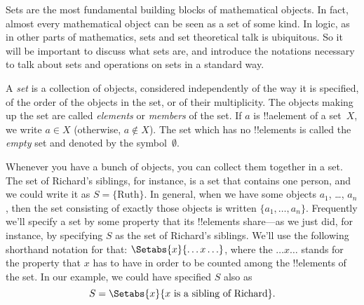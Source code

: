 \documentclass[../../../include/open-logic-section]{subfiles}
\begin{document}

\begin{explain}
Sets are the most fundamental building blocks of mathematical
objects. In fact, almost every mathematical object can be seen as a
set of some kind. In logic, as in other parts of mathematics, sets
and set theoretical talk is ubiquitous. So it will be important to
discuss what sets are, and introduce the notations necessary to talk
about sets and operations on sets in a standard way.
\end{explain}

\begin{defn}[Set]
A \emph{set} is a collection of objects, considered independently of
the way it is specified, of the order of the objects in the set, or of
their multiplicity. The objects making up the set are called
\emph{elements} or \emph{members} of the set. If $a$ is !!a{element}
of a set~$X$, we write $a \in X$ (otherwise, $a \notin X$). The set
which has no !!{element}s is called the \emph{empty} set and denoted
by the symbol~$\emptyset$.
\end{defn}

\begin{ex}
Whenever you have a bunch of objects, you can collect them together in
a set. The set of Richard's siblings, for instance, is a set that
contains one person, and we could write it as $S=\{\textrm{Ruth}\}$.
In general, when we have some objects $a_{1}$, \dots, $a_{n}$, then
the set consisting of exactly those objects is written $\{
a_{1}, \dots, a_{n}\}$. Frequently we'll specify a set by some
property that its !!{element}s share---as we just did, for instance, by
specifying $S$ as the set of Richard's siblings. We'll use the
following shorthand notation for that: $\Setabs{x}{\ldots x\ldots}$,
where the $\ldots x\ldots$ stands for the property that $x$ has to
have in order to be counted among the !!{element}s of the set. In our
example, we could have specified $S$ also as
\[
S = \Setabs{x}{x \text{ is a sibling of Richard}}.
\]
\end{ex}
\end{document}
